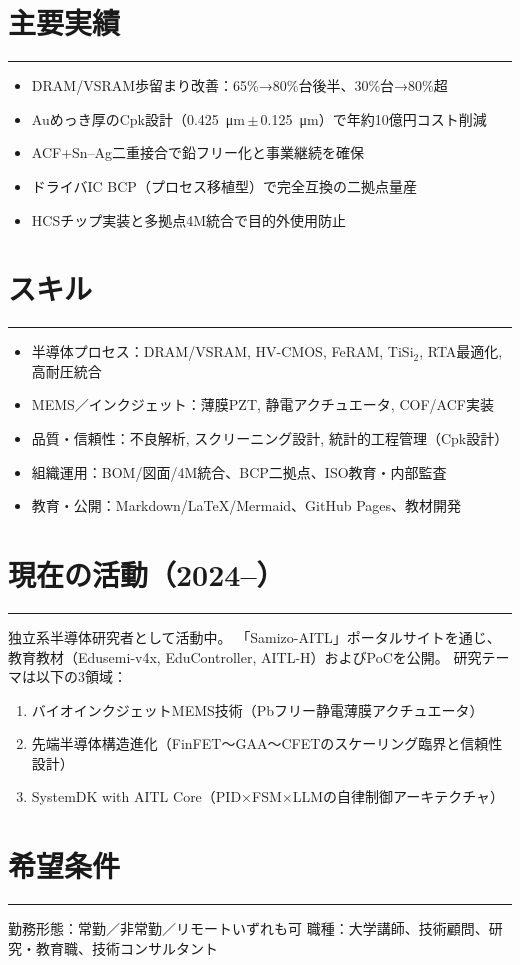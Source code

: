 \documentclass[11pt,ja=standard,engine=luatex]{bxjsarticle}
\newcommand{\cvsection}[1]{\section*{#1}\vspace{-0.3em}\hrule\vspace{0.5em}}
\begin{document}
\cvsection{主要実績}
\begin{itemize}
  \item DRAM/VSRAM歩留まり改善：65\%→80\%台後半、30\%台→80\%超
  \item Auめっき厚のCpk設計（\SI{0.425}{\micro\metre}\,\(\pm\)\,\SI{0.125}{\micro\metre}）で年約10億円コスト削減
  \item ACF+Sn--Ag二重接合で鉛フリー化と事業継続を確保
  \item ドライバIC BCP（プロセス移植型）で完全互換の二拠点量産
  \item HCSチップ実装と多拠点4M統合で目的外使用防止
\end{itemize}

\cvsection{スキル}
\begin{itemize}
  \item 半導体プロセス：DRAM/VSRAM, HV-CMOS, FeRAM, TiSi$_2$, RTA最適化, 高耐圧統合
  \item MEMS／インクジェット：薄膜PZT, 静電アクチュエータ, COF/ACF実装
  \item 品質・信頼性：不良解析, スクリーニング設計, 統計的工程管理（Cpk設計）
  \item 組織運用：BOM/図面/4M統合、BCP二拠点、ISO教育・内部監査
  \item 教育・公開：Markdown/LaTeX/Mermaid、GitHub Pages、教材開発
\end{itemize}

\cvsection{現在の活動（2024--）}
独立系半導体研究者として活動中。  
「Samizo-AITL」ポータルサイトを通じ、教育教材（Edusemi-v4x, EduController, AITL-H）およびPoCを公開。  
研究テーマは以下の3領域：
\begin{enumerate}
  \item バイオインクジェットMEMS技術（Pbフリー静電薄膜アクチュエータ）
  \item 先端半導体構造進化（FinFET～GAA～CFETのスケーリング臨界と信頼性設計）
  \item SystemDK with AITL Core（PID×FSM×LLMの自律制御アーキテクチャ）
\end{enumerate}

\cvsection{希望条件}
勤務形態：常勤／非常勤／リモートいずれも可  
職種：大学講師、技術顧問、研究・教育職、技術コンサルタント
\end{document}
